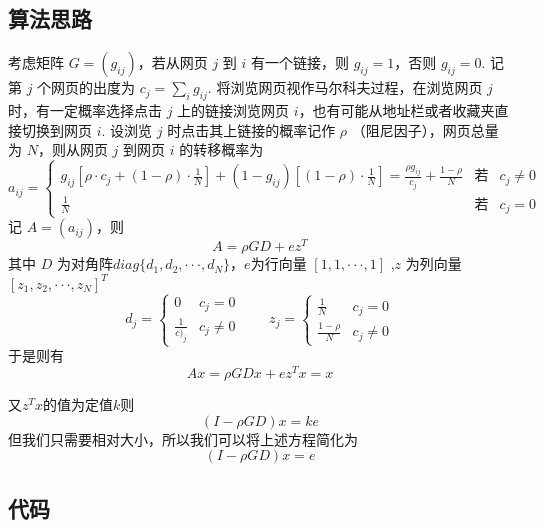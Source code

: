 \documentclass[a4paper,left=2.5cm,right=2.5cm]{article}
\begin{document}
\begin{spacing}{1.6}
	\subsection{算法思路}
	考虑矩阵 $G = (g_{ij})$，若从网页 $j$ 到 $i$ 有一个链接，则 $g_{ij} = 1$，否则 $g_{ij} = 0$. 记第 $j$ 个网页的出度为
	$c_j = \sum\limits_i g_{ij}$. 将浏览网页视作马尔科夫过程，在浏览网页 $j$ 时，有一定概率选择点击 $j$ 上的链接浏览网页 $i$，也有可能从地址栏或者收藏夹直接切换到网页 $i$. 设浏览 $j$ 时点击其上链接的概率记作 $\rho$ （阻尼因子），网页总量为 $N$，则从网页 $j$ 到网页 $i$ 的转移概率为
	\begin{equation}
	a_{ij} = 
	\left\{
	\begin{array}{lll}
	g_{ij} [\rho\cdot c_{j} + (1 − \rho)\cdot \frac{1}{N} ] + (1 − g_{ij}) [(1 − \rho) \cdot\frac{1}{N} ] = \frac{\rho g_{ij}}{c_j} +\frac{1-\rho}{N}& \text{若}& c_j\neq 0 \\
	\frac{1}{N}& \text{若} & c_j = 0
	\end{array}
	\right.
	\end{equation}
	记 $A = (a_{ij})$，则
	\begin{equation}
	A = \rho GD + ez^T
	\end{equation}
	其中 $D$ 为对角阵$ diag\{d_1, d_2, · · · , d_N\}$，$ e $为行向量 $[1, 1, · · · , 1]$ ,$z$ 为列向量$ [z_1, z_2, · · · , z_N]^T$
	\begin{equation}
	d_j = \left\{\begin{array}{ll}
	0&c_j=0\\
	\frac{1}{c)_j}&c_j\neq 0
	\end{array}
	\right.
	\qquad
	z_j = \left\{
	\begin{array}{ll}
	\frac{1}{N}& c_j=0\\
	\frac{1-\rho}{N}& c_j\neq 0 
	\end{array}
	\right.
	\end{equation}
	于是则有
	\begin{equation}
	Ax = \rho GDx+ez^Tx = x
	\end{equation}
	
	又$z^Tx$的值为定值$k$则
	\begin{equation}
	(I-\rho GD)x = ke
	\end{equation}
	但我们只需要相对大小，所以我们可以将上述方程简化为
	\begin{equation}
	(I-\rho GD)x = e
	\end{equation}
	\subsection{代码}
	

\end{spacing}
\end{document}
